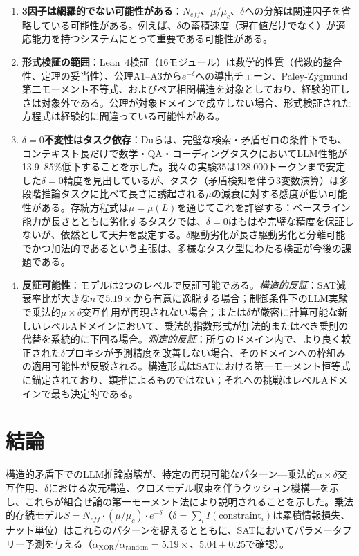 \documentclass[11pt,a4paper]{article}
\begin{document}
\begin{enumerate}
    \item \textbf{3因子は網羅的でない可能性がある}：$N_{eff}$、$\mu/\mu_c$、$\delta$への分解は関連因子を省略している可能性がある。例えば、$\delta$の蓄積速度（現在値だけでなく）が適応能力を持つシステムにとって重要である可能性がある。

    \item \textbf{形式検証の範囲}：Lean~4検証（16モジュール）は数学的性質（代数的整合性、定理の妥当性）、公理A1--A3から$e^{-\delta}$への導出チェーン、Paley-Zygmund第二モーメント不等式、およびペア相関構造を対象としており、経験的正しさは対象外である。公理が対象ドメインで成立しない場合、形式検証された方程式は経験的に間違っている可能性がある。

    \item \textbf{$\delta = 0$不変性はタスク依存}：Duら\cite{du2025contextlength}は、完璧な検索・矛盾ゼロの条件下でも、コンテキスト長だけで数学・QA・コーディングタスクにおいてLLM性能が13.9--85\%低下することを示した。我々の実験35は128{,}000トークンまで安定した$\delta = 0$精度を見出しているが、タスク（矛盾検知を伴う3変数演算）は多段階推論タスクに比べて長さに誘起される$\mu$の減衰に対する感度が低い可能性がある。存続方程式は$\mu = \mu(L)$を通じてこれを許容する：ベースライン能力が長さとともに劣化するタスクでは、$\delta = 0$はもはや完璧な精度を保証しないが、依然として天井を設定する。$\delta$駆動劣化が長さ駆動劣化と分離可能でかつ加法的であるという主張は、多様なタスク型にわたる検証が今後の課題である。

    \item \textbf{反証可能性}：モデルは2つのレベルで反証可能である。\emph{構造的反証}：SAT減衰率比が大きな$n$で$5.19\times$から有意に逸脱する場合；制御条件下のLLM実験で乗法的$\mu \times \delta$交互作用が再現されない場合；または$\delta$が厳密に計算可能な新しいレベルAドメインにおいて、乗法的指数形式が加法的またはべき乗則の代替を系統的に下回る場合。\emph{測定的反証}：所与のドメイン内で、より良く較正された$\delta$プロキシが予測精度を改善しない場合、そのドメインへの枠組みの適用可能性が反駁される。構造形式はSATにおける第一モーメント恒等式に錨定されており、類推によるものではない；それへの挑戦はレベルAドメインで最も決定的である。
\end{enumerate}

\section{結論}
\label{sec:conclusion}

構造的矛盾下でのLLM推論崩壊が、特定の再現可能なパターン---乗法的$\mu \times \delta$交互作用、$\delta$における次元構造、クロスモデル収束を伴うクッション機構---を示し、これらが組合せ論の第一モーメント法により説明されることを示した。乗法的存続モデル$S = N_{eff} \cdot (\mu/\mu_c) \cdot e^{-\delta}$（$\delta = \sum_i I(\text{constraint}_i)$は累積情報損失、ナット単位）はこれらのパターンを捉えるとともに、SATにおいてパラメータフリー予測を与える（$\alpha_{\text{XOR}}/\alpha_{\text{random}} = 5.19\times$、$5.04 \pm 0.25$で確認）。
\end{document}
